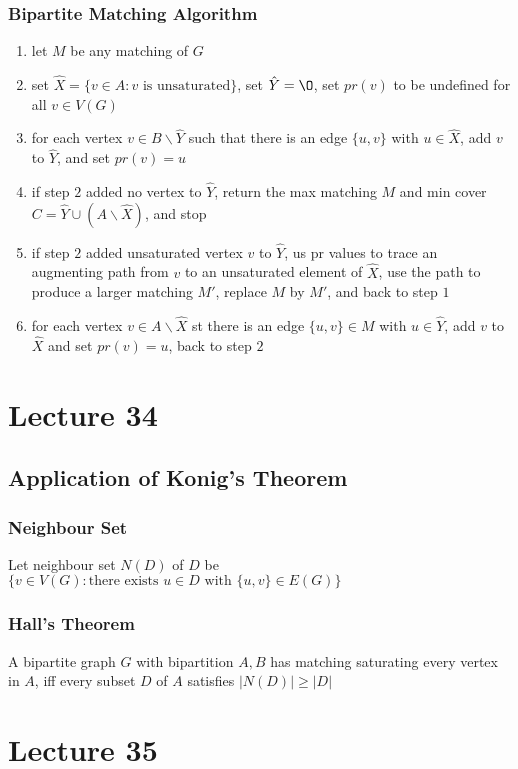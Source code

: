 \documentclass[11pt]{article}
\begin{document}
\subsubsection*{Bipartite Matching Algorithm}
\begin{enumerate}[Step 1:]
  \item let $M$ be any matching of $G$
  \item set $\hat{X}=\{v\in A: v\text{ is unsaturated}\}$, set $\hat{Y}=\O$, set $pr(v)$ to be undefined for all $v\in V(G)$
  \item for each vertex $v\in B\backslash\hat{Y}$ such that there is an edge $\{u,v\}$ with $u\in\hat{X}$, add $v$ to $\hat{Y}$, and set $pr(v)=u$
  \item if step $2$ added no vertex to $\hat{Y}$, return the max matching $M$ and min cover $C=\hat{Y}\cup(A\backslash\hat{X})$, and stop
  \item if step $2$ added unsaturated vertex $v$ to $\hat{Y}$, us pr values to trace an augmenting path from $v$ to an unsaturated element of $\hat{X}$, use the path to produce a larger matching $M'$, replace $M$ by $M'$, and back to step $1$
  \item for each vertex $v\in A\backslash\hat{X}$ st there is an edge $\{u,v\}\in M$ with $u\in\hat{Y}$, add $v$ to $\hat{X}$ and set $pr(v)=u$, back to step $2$
\end{enumerate}

\section{Lecture 34}
\subsection{Application of Konig's Theorem}
\subsubsection*{Neighbour Set}
Let neighbour set $N(D)$ of $D$ be $\{v\in V(G):\text{there exists }u\in D \text{ with }\{u,v\}\in E(G)\}$
\subsubsection*{Hall's Theorem}
A bipartite graph $G$ with bipartition $A, B$ has matching saturating every vertex in $A$, iff every subset $D$ of $A$ satisfies $|N(D)|\geq|D|$

\section{Lecture 35}
\end{document}
